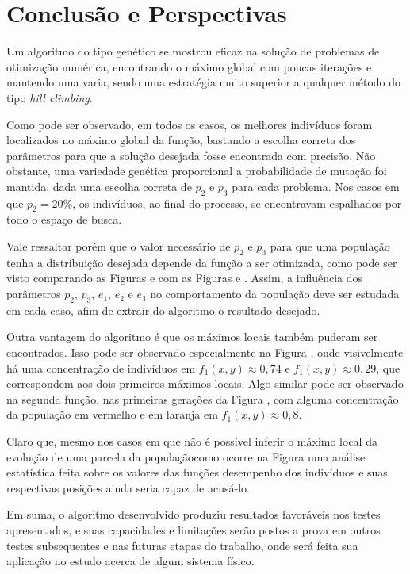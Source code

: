 \chapter{Conclusão e Perspectivas}\label{cap_conclusao}

Um algoritmo do tipo genético se mostrou eficaz na solução de problemas de otimização
numérica, encontrando o máximo global com poucas iterações e mantendo uma varia, sendo uma
estratégia muito superior a qualquer método do tipo \textit{hill climbing}. 

Como pode ser observado, em todos os casos, os melhores indivíduos foram localizados no máximo global
da função, bastando a escolha correta dos parâmetros para que a solução desejada
fosse encontrada com precisão. Não obstante, uma variedade genética proporcional a
probabilidade de mutação foi mantida, dada uma escolha correta de $p_2$ e $p_3$ para cada
problema. Nos casos em que $p_2 = 20\%$, os indivíduos, ao final do processo, se encontravam
espalhados por todo o espaço de busca. 

Vale ressaltar porém que o valor necessário de $p_2$ e $p_3$ para que uma população 
tenha a distribuição desejada depende da função a ser otimizada, como pode ser visto
comparando as Figuras  e 
com as Figuras  e .
Assim, a influência dos parâmetros $p_2$, $p_3$, $e_1$, $e_2$ e $e_3$ no comportamento da população
deve ser estudada em cada caso, afim de extrair do algoritmo o resultado desejado.

Outra vantagem do algoritmo é que os máximos locais também puderam ser encontrados.
Isso pode ser observado especialmente na Figura ,
onde visivelmente há uma concentração de indivíduos em $ f_1(x,y) \approx 0,74 $ e 
$ f_1(x,y) \approx 0,29 $, que correspondem aos dois primeiros máximos locais.
Algo similar pode ser observado na segunda função, nas primeiras gerações da Figura 
, com alguma concentração da população em
vermelho e em laranja em $f_1(x,y) \approx 0,8$.

Claro que, mesmo nos casos em que não é possível inferir o máximo local da evolução
de uma parcela da população\trav como ocorre na Figura \trav
uma análise estatística feita sobre os valores das funções desempenho dos indivíduos e
suas respectivas posições ainda seria capaz de acusá-lo.

Em suma, o algoritmo desenvolvido produziu resultados favoráveis nos testes apresentados, e suas capacidades
e limitações serão postos a prova em outros testes subsequentes e nas futuras etapas do trabalho, 
onde será feita sua aplicação no estudo acerca de algum sistema físico.

\nocite{charbonneau2002ga}